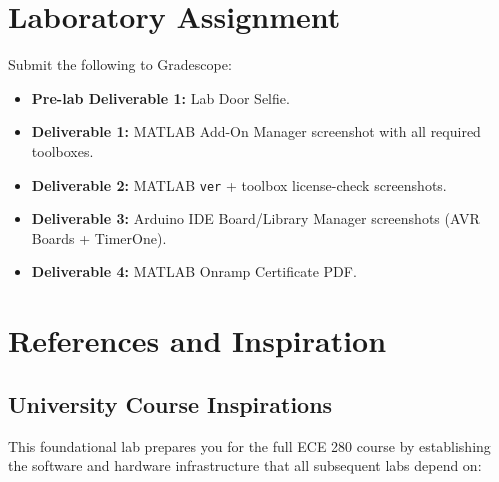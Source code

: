 \documentclass[12pt]{article}
\begin{document}

\section{Laboratory Assignment}
Submit the following to Gradescope:
\begin{itemize}
    \item \textbf{Pre-lab Deliverable 1:} Lab Door Selfie.
    \item \textbf{Deliverable 1:} MATLAB Add-On Manager screenshot with all required toolboxes.
    \item \textbf{Deliverable 2:} MATLAB \texttt{ver} + toolbox license-check screenshots.
    \item \textbf{Deliverable 3:} Arduino IDE Board/Library Manager screenshots (AVR Boards + TimerOne).
    \item \textbf{Deliverable 4:} MATLAB Onramp Certificate PDF.
\end{itemize}

\clearpage

\section*{References and Inspiration}

\subsection*{University Course Inspirations}

This foundational lab prepares you for the full ECE 280 course by establishing the software and hardware infrastructure that all subsequent labs depend on:
\end{document}
